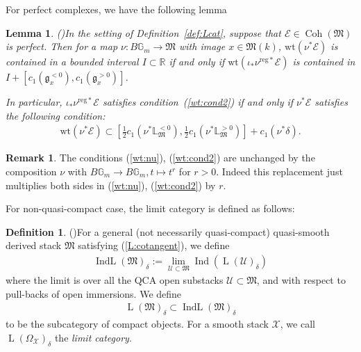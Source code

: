 \documentclass[11pt,oneside,a4paper,mathscr]{amsart}
\newtheorem{lemma}[thm]{Lemma}
\theoremstyle{definition}
\newtheorem{defn}[thm]{Definition}
\newtheorem{remark}[thm]{Remark}
\newcommand{\LL}{\operatorname{L}}
\newcommand{\X}{\mathcal{X}}
\newcommand{\cE}{\mathcal{E}}
\newcommand{\bgm}{B\mathbb{G}_m}
\newcommand{\Coh}{\operatorname{Coh}}
\newcommand{\Ind}{\operatorname{Ind}}
\newcommand{\IndL}{\operatorname{IndL}}
\newcommand{\wt}{\mathrm{wt}}
\begin{document}
For perfect complexes, we have the following lemma
\begin{lemma}\emph{(\cite[Lemma~6.1]{TodaGL2})}\label{lem:perfect}
In the setting of Definition~\ref{def:Lcat}, suppose that
$\cE \in \Coh(\mathfrak{M})$ is perfect. Then for a map
$\nu \colon \bgm \to \mathfrak{M}$ with image $x\in \mathfrak{M}(k)$, 
$\mathrm{wt}(\nu^*\cE)$ is contained in a bounded interval $I \subset \mathbb{R}$ 
if and only if 
$\mathrm{wt}(\iota_{*}\nu^{\mathrm{reg}*}\cE)$ is contained in 
$I+[c_1(\mathfrak{g}_x^{<0}), c_1(\mathfrak{g}_x^{>0})]$. 

In particular, $\iota_{*}\nu^{\mathrm{reg}*}\cE$ satisfies condition~(\ref{wt:cond2}) if and only if 
$\nu^* \cE$ satisfies the following condition:
\begin{align}\label{wt:cond2}
    \wt(\nu^* \cE) \subset \left[\frac{1}{2} c_1 (\nu^{\ast}\mathbb{L}_{\mathfrak{M}}^{<0}), 
    \frac{1}{2} c_1 (\nu^{\ast}\mathbb{L}_{\mathfrak{M}}^{>0})
    \right]+c_1(\nu^{\ast}\delta).
\end{align}
\end{lemma}
\begin{remark}\label{rmk:cond:r}
The conditions (\ref{wt:nu}), (\ref{wt:cond2}) are unchanged by the composition $\nu$ with 
$\bgm \to \bgm, t\mapsto t^r$ for $r>0$. Indeed this replacement just multiplies both 
sides in (\ref{wt:nu}), (\ref{wt:cond2}) by $r$. 
\end{remark}









For non-quasi-compact case, the limit category is defined as follows: 
\begin{defn}(\cite[Section~3.7]{PTlim})\label{def:IndL}
For a general (not necessarily quasi-compact) quasi-smooth derived stack 
$\mathfrak{M}$ satisfying (\ref{L:cotangent}), 
we define 
\begin{align*}
    \IndL(\mathfrak{M})_{\delta}:=\lim_{\mathcal{U}\subset \mathfrak{M}} \Ind(\LL(\mathcal{U})_{\delta})
\end{align*}
where the limit is over all the QCA open substacks $\mathcal{U}\subset \mathfrak{M}$,
and with respect to pull-backs of open immersions. 
We define 
\begin{align*}
    \LL(\mathfrak{M})_{\delta} \subset \IndL(\mathfrak{M})_{\delta}
\end{align*}
to be the subcategory of compact objects. 
For a smooth stack $\mathcal{X}$, we 
call $\LL(\Omega_{\X})_{\delta}$ the \textit{limit category}.
\end{defn}
\end{document}
